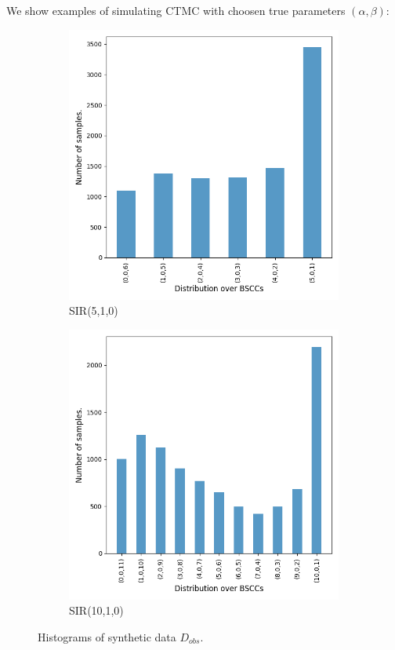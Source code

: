 We show examples of simulating CTMC with choosen true parameters $(\alpha, \beta)$:
\begin{figure}[H]
    \centering
    \begin{subfigure}{0.3\textwidth}
        \centering
        \includegraphics[width=\linewidth]{figures/sir510_data.png}
        \caption{SIR(5,1,0)}
    \end{subfigure}
    \hfill
    \begin{subfigure}{0.3\textwidth}
        \centering
        \includegraphics[width=\linewidth]{figures/sir1010_data.png}
        \caption{SIR(10,1,0)}
    \end{subfigure}
    \caption{Histograms of synthetic data $D_{obs}$.}
\end{figure}

